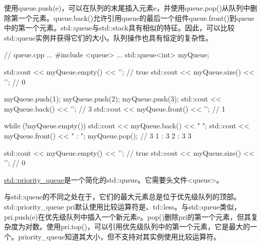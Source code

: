使用queue.push(e)，可以在队列的末尾插入元素e，并使用queue.pop()从队列中删除第一个元素。queue.back()允许引用queue的最后一个组件queue.front()到queue中的第一个元素。std::queue与std::stack具有相似的特征。因此，可以比较std::queue实例并获得它们的大小。队列操作也具有恒定的复杂性。


\begin{cpp}
// queue.cpp
...
#include <queue>
...
std::queue<int> myQueue;

std::cout << myQueue.empty() << '\n'; // true
std::cout << myQueue.size() << '\n'; // 0

myQueue.push(1);
myQueue.push(2);
myQueue.push(3);
std::cout << myQueue.back() << '\n'; // 3
std::cout << myQueue.front() << '\n'; // 1

while (!myQueue.empty()){
	std::cout << myQueue.back() << " ";
	std::cout << myQueue.front() << " : ";
	myQueue.pop();
} // 3 1 : 3 2 : 3 3
	
std::cout << myQueue.empty() << '\n'; // true
std::cout << myQueue.size() << '\n'; // 0
\end{cpp}




\href{http://en.cppreference.com/w/cpp/container/priority_queue}{std::priority\_queue}是一个简化的std::queue。它需要头文件<queue>。

与std::queue的不同之处在于，它们的最大元素总是位于优先级队列的顶部。std::priority\_queue pri默认使用比较运算符是、td::less。与std::queue类似，pri.push(e)在优先级队列中插入一个新元素e。pop()删除pri的第一个元素，但其复杂度为对数。使用pri.top()，可以引用优先级队列中的第一个元素，它是最大的一个。priority\_queue知道其大小，但不支持对其实例使用比较运算符。


